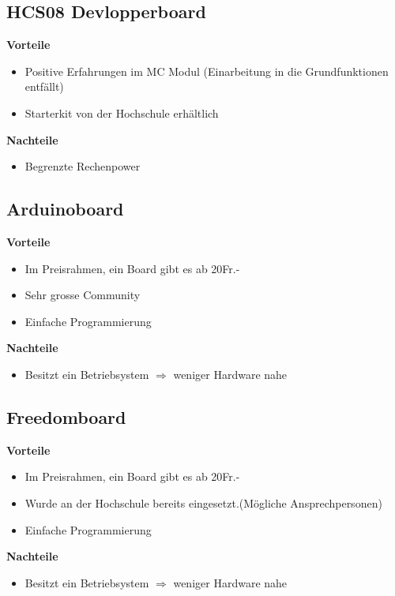 \subsection{HCS08 Devlopperboard}
\textbf {Vorteile}
\begin{itemize}
\item Positive Erfahrungen im MC Modul (Einarbeitung in die Grundfunktionen entfällt)
\item Starterkit von der Hochschule erhältlich \\
\end{itemize}
\textbf {Nachteile}
\begin{itemize}
\item Begrenzte Rechenpower
\end{itemize}

\subsection{Arduinoboard}
\textbf {Vorteile}
\begin{itemize}
\item Im Preisrahmen, ein Board gibt es ab 20Fr.-
\item Sehr grosse Community
\item Einfache Programmierung\\
\end{itemize}
\textbf {Nachteile}
\begin{itemize}
\item Besitzt ein Betriebsystem $\Rightarrow$ weniger Hardware nahe
\end{itemize}

\subsection{Freedomboard}
\textbf {Vorteile}
\begin{itemize}
\item Im Preisrahmen, ein Board gibt es ab 20Fr.-
\item Wurde an der Hochschule bereits eingesetzt.(Mögliche Ansprechpersonen)
\item Einfache Programmierung\\
\end{itemize}
\textbf {Nachteile}
\begin{itemize}
\item Besitzt ein Betriebsystem $\Rightarrow$ weniger Hardware nahe
\end{itemize}

